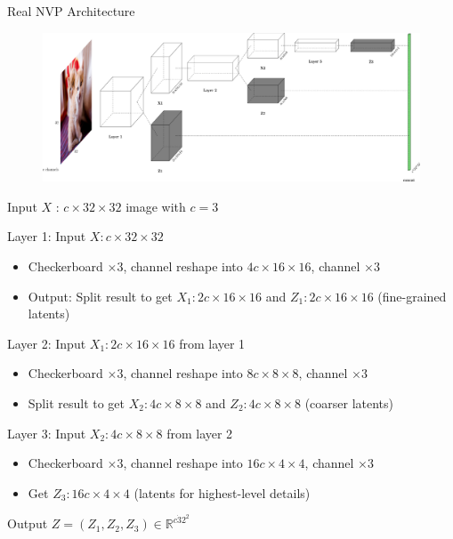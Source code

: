 \begin{frame}[allowframebreaks]

\begin{mydefinitionblock}{10.30}{Real NVP Architecture}
    \begin{figure}[H]
        \centering
        \includegraphics[width=1.0\textwidth]{.././assets/10.16.png}
    \end{figure}

    Input $X$ : $c \times 32 \times 32$ image with $c=3$

    Layer 1: Input $X: c \times 32 \times 32$

    \begin{itemize}
        \item Checkerboard $\times 3$, channel reshape into $4 c \times 16 \times 16$, channel $\times 3$
        \item Output: Split result to get $X_{1}: 2 c \times 16 \times 16$ and $Z_{1}: 2 c \times 16 \times 16$ (fine-grained latents)
    \end{itemize}

    Layer 2: Input $X_{1}: 2 c \times 16 \times 16$ from layer 1

    \begin{itemize}
        \item Checkerboard $\times 3$, channel reshape into $8 c \times 8 \times 8$, channel $\times 3$
        \item Split result to get $X_{2}: 4 c \times 8 \times 8$ and $Z_{2}: 4 c \times 8 \times 8$ (coarser latents)
    \end{itemize}

    Layer 3: Input $X_{2}: 4 c \times 8 \times 8$ from layer 2

    \begin{itemize}
        \item Checkerboard $\times 3$, channel reshape into $16 c \times 4 \times 4$, channel $\times 3$
        \item Get $Z_{3}: 16 c \times 4 \times 4$ (latents for highest-level details)
    \end{itemize}

    Output $Z = (Z_1, Z_2, Z_3) \in \mathbb{R}^{c \dot 32^2}$
\end{mydefinitionblock}

\end{frame}

